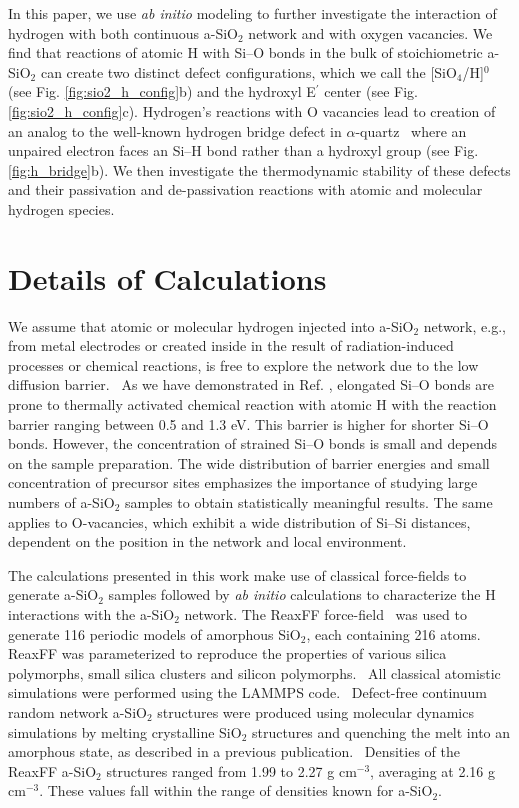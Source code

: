 \documentclass[aps,prb,reprint,superscriptaddress,showpacs]{revtex4-1}
\begin{document}
In this paper, we use \emph{ab initio} modeling to further investigate the interaction of hydrogen with both continuous a-SiO$_2$ network and with oxygen vacancies. We find that reactions of atomic H with \mbox{Si--O} bonds in the bulk of stoichiometric a-SiO$_2$ can create two distinct defect configurations, which we call the [SiO$_4$/H]$^0$ (see Fig. \ref{fig:sio2_h_config}b) and the hydroxyl E$^\prime$ center (see Fig. \ref{fig:sio2_h_config}c). Hydrogen's reactions with O vacancies lead to creation of an analog to the well-known hydrogen bridge defect in $\alpha$-quartz~\cite{blochl_vacancies,alkauskas_h} where an unpaired electron faces an \mbox{Si--H} bond rather than a hydroxyl group (see Fig. \ref{fig:h_bridge}b). We then investigate the thermodynamic stability of these defects and their passivation and de-passivation reactions with atomic and molecular hydrogen species. 

\section{Details of Calculations}
\label{sec:calc_details}

We assume that atomic or molecular hydrogen injected into a-SiO$_2$ network, e.g., from metal electrodes or created inside in the result of radiation-induced processes or chemical reactions, is free to explore the network due to the low diffusion barrier.~\cite{kajihara_hydrogen,skuja_hdiffusion} As we have demonstrated in Ref. \cite{aelsayed_prl}, elongated \mbox{Si--O} bonds are prone to thermally activated chemical reaction with atomic H with the reaction barrier ranging between 0.5 and 1.3 eV. This barrier is higher for shorter \mbox{Si--O} bonds. However, the concentration of strained \mbox{Si--O} bonds is small and depends on the sample preparation. The wide distribution of barrier energies and small concentration of precursor sites emphasizes the importance of studying large numbers of a-SiO$_2$ samples to obtain statistically meaningful results. The same applies to O-vacancies, which exhibit a wide distribution of \mbox{Si--Si} distances, dependent on the position in the network and local environment.~\cite{asio2_3}

The calculations presented in this work make use of classical force-fields to generate a-SiO$_2$ samples followed by \emph{ab initio} calculations to characterize the H interactions with the a-SiO$_2$ network. The ReaxFF force-field~\cite{reaxff_sisio} was used to generate 116 periodic models of amorphous SiO$_{2}$, each containing 216 atoms. ReaxFF was parameterized to reproduce the properties of various silica polymorphs, small silica clusters and silicon polymorphs.~\cite{reaxff_h2o} All classical atomistic simulations were performed using the LAMMPS code.~\cite{lammps} Defect-free continuum random network a-SiO$_2$ structures were produced using molecular dynamics simulations by melting crystalline SiO$_2$ structures and quenching the melt into an amorphous state, as described in a previous publication.~\cite{aelsayed_prb} Densities of the ReaxFF a-SiO$_2$ structures ranged from 1.99 to 2.27 g cm$^{-3}$, averaging at 2.16 g cm$^{-3}$. These values fall within the range of densities known for a-SiO$_2$.  
\end{document}
